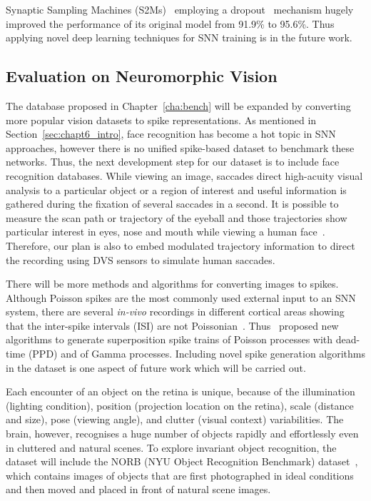 Synaptic Sampling Machines (S2Ms)~\citep{neftci2016stochastic} employing a dropout~\citep{srivastava2014dropout} mechanism hugely improved the performance of its original model from 91.9\% to 95.6\%.
Thus applying novel deep learning techniques for SNN training is in the future work.


\subsection{Evaluation on Neuromorphic Vision}
The database proposed in Chapter~\ref{cha:bench} will be expanded by converting more popular vision datasets to spike representations.
As mentioned in Section~\ref{sec:chapt6_intro}, face recognition has become a hot topic in SNN approaches, however there is no unified spike-based dataset to benchmark these networks.
Thus, the next development step for our dataset is to include face recognition databases.
While viewing an image, saccades direct high-acuity visual analysis to a particular object or a region of interest and useful information is gathered during the fixation of several saccades in a second.
It is possible to measure the scan path or trajectory of the eyeball and those trajectories show particular interest in eyes, nose and mouth while viewing a human face~\citep{yarbus1967eye}.
Therefore, our plan is also to embed modulated trajectory information to direct the recording using DVS sensors to simulate human saccades.

There will be more methods and algorithms for converting images to spikes.
Although Poisson spikes are the most commonly used external input to an SNN system, there are several \textit{in-vivo} recordings in different cortical areas showing that the inter-spike intervals (ISI) are not Poissonian~\citep{deger2012statistical}. 
Thus~\citep{deger2012statistical} proposed new algorithms to generate superposition spike trains of Poisson processes with dead-time (PPD) and of Gamma processes.
Including novel spike generation algorithms in the dataset is one aspect of future work which will be carried out.

Each encounter of an object on the retina is unique, because of the illumination (lighting condition), position (projection location on the retina), scale (distance and size), pose (viewing angle), and clutter (visual context) variabilities.
The brain, however, recognises a huge number of objects rapidly and effortlessly even in cluttered and natural scenes.
To explore invariant object recognition, the dataset will include the NORB (NYU Object Recognition Benchmark) dataset~\citep{lecun2004learning}, which contains images of objects that are first photographed in ideal conditions and then moved and placed in front of natural scene images.

